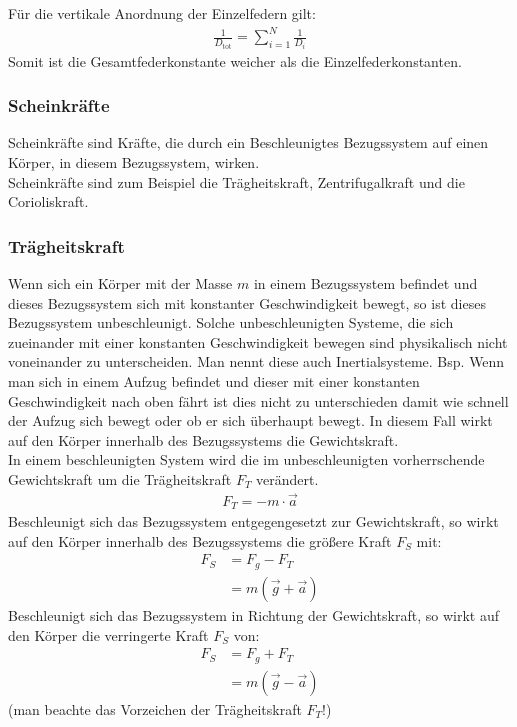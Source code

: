 \documentclass{article}
\begin{document}
\noindent Für die vertikale Anordnung der Einzelfedern gilt:
\begin{align}
    \frac{1}{D_\mathrm{tot}}=\sum_{i=1}^{N}\frac{1}{D_i}
\end{align}
Somit ist die Gesamtfederkonstante weicher als die Einzelfederkonstanten.

\subsubsection{Scheinkräfte}
Scheinkräfte sind Kräfte, die durch ein Beschleunigtes Bezugssystem auf einen Körper, in diesem Bezugssystem, wirken.\\
Scheinkräfte sind zum Beispiel die Trägheitskraft, Zentrifugalkraft und die Corioliskraft.

\subsubsection*{Trägheitskraft}
Wenn sich ein Körper mit der Masse $m$ in einem Bezugssystem befindet und dieses Bezugssystem sich mit konstanter Geschwindigkeit bewegt,
so ist dieses Bezugssystem unbeschleunigt. Solche unbeschleunigten Systeme, die sich zueinander mit einer konstanten Geschwindigkeit
bewegen sind physikalisch nicht voneinander zu unterscheiden. Man nennt diese auch Inertialsysteme. Bsp. Wenn man sich in einem Aufzug befindet
und dieser mit einer konstanten Geschwindigkeit nach oben fährt ist dies nicht zu unterschieden damit wie schnell der Aufzug 
sich bewegt oder ob er sich überhaupt bewegt. In diesem Fall wirkt auf den Körper innerhalb des Bezugssystems die Gewichtskraft.\\

\noindent In einem beschleunigten System wird die im unbeschleunigten vorherrschende Gewichtskraft um die Trägheitskraft $F_T$ verändert.
\begin{align}
    F_T=-m\cdot \vec{a}
\end{align}
Beschleunigt sich das Bezugssystem entgegengesetzt zur Gewichtskraft, so wirkt auf den Körper innerhalb
des Bezugssystems die größere Kraft $F_S$ mit:
\begin{align}
    F_S&=F_g-F_T\\
    &=m(\vec{g}+\vec{a})
\end{align}
Beschleunigt sich das Bezugssystem in Richtung der Gewichtskraft, so wirkt auf den Körper die verringerte Kraft $F_S$ von:
\begin{align}
    F_S&=F_g+F_T\\
    &=m(\vec{g}-\vec{a})
\end{align}
(man beachte das Vorzeichen der Trägheitskraft $F_T$!)
\end{document}
